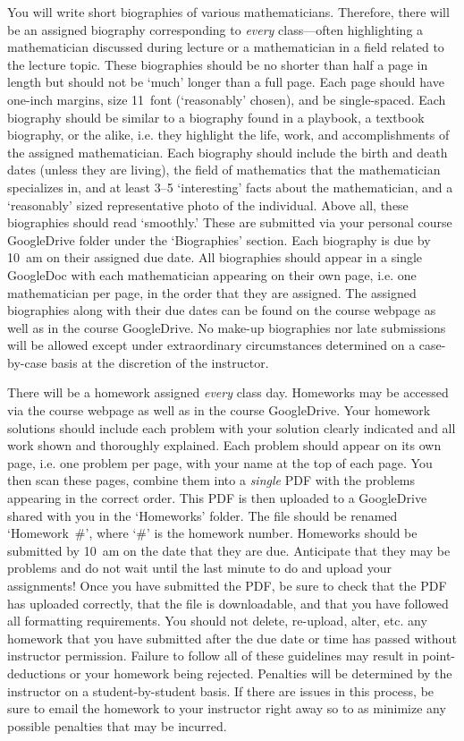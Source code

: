 \documentclass[11pt,letterpaper]{article}
\begin{document}
You will write short biographies of various mathematicians. Therefore, there will be an assigned biography corresponding to \textit{every} class---often highlighting a mathematician discussed during lecture or a mathematician in a field related to the lecture topic. These biographies should be no shorter than half a page in length but should not be `much' longer than a full page. Each page should have one-inch margins, size 11~font (`reasonably' chosen), and be single-spaced. Each biography should be similar to a biography found in a playbook, a textbook biography, or the alike, i.e. they highlight the life, work, and accomplishments of the assigned mathematician. Each biography should include the birth and death dates (unless they are living), the field of mathematics that the mathematician specializes in, and at least 3--5 `interesting' facts about the mathematician, and a `reasonably' sized representative photo of the individual. Above all, these biographies should read `smoothly.' These are submitted via your personal course GoogleDrive folder under the `Biographies' section. Each biography is due by 10~am on their assigned due date. All biographies should appear in a single GoogleDoc with each mathematician appearing on their own page, i.e. one mathematician per page, in the order that they are assigned. The assigned biographies along with their due dates can be found on the course webpage as well as in the course GoogleDrive. No make-up biographies nor late submissions will be allowed except under extraordinary circumstances determined on a case-by-case basis at the discretion of the instructor. \pspace


There will be a homework assigned \textit{every} class day. Homeworks may be accessed via the course webpage as well as in the course GoogleDrive. Your homework solutions should include each problem with your solution clearly indicated and all work shown and thoroughly explained. Each problem should appear on its own page, i.e. one problem per page, with your name at the top of each page. You then scan these pages, combine them into a \textit{single} PDF with the problems appearing in the correct order. This PDF is then uploaded to a GoogleDrive shared with you in the `Homeworks' folder. The file should be renamed `Homework~\#', where `\#' is the homework number. Homeworks should be submitted by 10~am on the date that they are due. Anticipate that they may be problems and do not wait until the last minute to do and upload your assignments! Once you have submitted the PDF, be sure to check that the PDF has uploaded correctly, that the file is downloadable, and that you have followed all formatting requirements. You should not delete, re-upload, alter, etc. any homework that you have submitted after the due date or time has passed without instructor permission. Failure to follow all of these guidelines may result in point-deductions or your homework being rejected. Penalties will be determined by the instructor on a student-by-student basis. If there are issues in this process, be sure to email the homework to your instructor right away so to as minimize any possible penalties that may be incurred. \pspace
\end{document}
